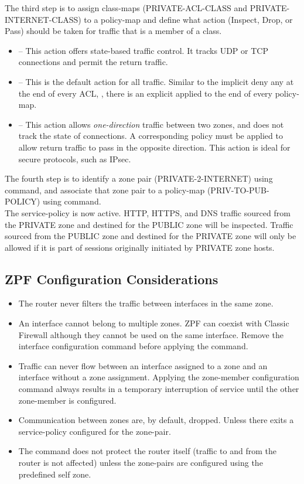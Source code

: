 The third step is to assign class-maps (PRIVATE-ACL-CLASS and PRIVATE-INTERNET-CLASS) to a policy-map and define what action (Inspect, Drop, or Pass) should be taken for traffic that is a member of a class. 

\begin{itemize}
\item {} -- This action offers state-based traffic control. It tracks UDP or TCP connections and permit the return traffic.
\item {} -- This is the default action for all traffic. Similar to the implicit deny any at the end of every ACL, , there is an explicit  applied to the end of every policy-map.
\item {} -- This action allows \emph{one-direction} traffic between two zones, and does not track the state of connections. A corresponding policy must be applied to allow return traffic to pass in the opposite direction. This action is ideal for secure protocols, such as IPsec. 
\end{itemize}

The fourth step is to identify a zone pair (PRIVATE-2-INTERNET) using  command, and associate that zone pair to a policy-map (PRIV-TO-PUB-POLICY) using  command.\\

The service-policy is now active. HTTP, HTTPS, and DNS traffic sourced from the PRIVATE zone and destined for the PUBLIC zone will be inspected. Traffic sourced from the PUBLIC zone and destined for the PRIVATE zone will only be allowed if it is part of sessions originally initiated by PRIVATE zone hosts.

\subsection{ZPF Configuration Considerations}

\begin{itemize}
\item The router never filters the traffic between interfaces in the same zone.
\item An interface cannot belong to multiple zones.
ZPF can coexist with Classic Firewall although they cannot be used on the same interface. Remove the  interface configuration command before applying the  command.
\item Traffic can never flow between an interface assigned to a zone and an interface without a zone assignment. Applying the zone-member configuration command always results in a temporary interruption of service until the other zone-member is configured.
\item Communication between zones are, by default, dropped. Unless there exits a service-policy configured for the zone-pair.
\item The  command does not protect the router itself (traffic to and from the router is not affected) unless the zone-pairs are configured using the predefined self zone.
\end{itemize}